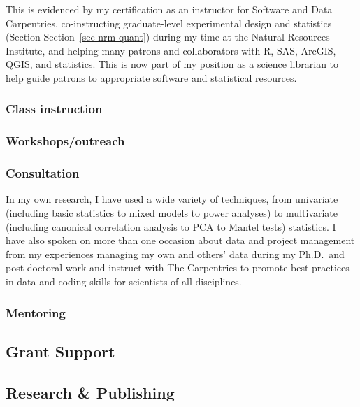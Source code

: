 \documentclass[
  letterpaper,
  DIV=11,
  numbers=noendperiod,
  oneside]{scrreprt}
\begin{document}
This is evidenced by my certification as an instructor for Software and
Data Carpentries, co-instructing graduate-level experimental design and
statistics (Section Section~\ref{sec-nrm-quant}) during my time at the
Natural Resources Institute, and helping many patrons and collaborators
with R, SAS, ArcGIS, QGIS, and statistics. This is now part of my
position as a science librarian to help guide patrons to appropriate
software and statistical resources.

\subsubsection{Class instruction}\label{class-instruction}

\subsubsection{Workshops/outreach}\label{workshopsoutreach}

\subsubsection{Consultation}\label{consultation}

In my own research, I have used a wide variety of techniques, from
univariate (including basic statistics to mixed models to power
analyses) to multivariate (including canonical correlation analysis to
PCA to Mantel tests) statistics. I have also spoken on more than one
occasion about data and project management from my experiences managing
my own and others' data during my Ph.D.~and post-doctoral work and
instruct with The Carpentries to promote best practices in data and
coding skills for scientists of all disciplines.

\subsubsection{Mentoring}\label{mentoring}

\subsection{Grant Support}\label{grant-support}

\subsection{Research \& Publishing}\label{research-publishing}

\end{document}
